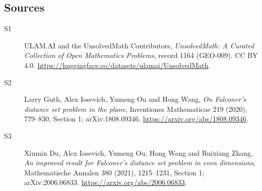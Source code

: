 \documentclass[11pt]{article}
\begin{document}
\subsection{Sources}
\begin{description}
\item[\hypertarget{source:1164:1}{S1}] ULAM.AI and the UnsolvedMath Contributors, \emph{UnsolvedMath: A Curated Collection of Open Mathematics Problems}, record 1164 (GEO-009). CC BY 4.0. \url{https://huggingface.co/datasets/ulamai/UnsolvedMath}.
\item[\hypertarget{source:1164:2}{S2}] Larry Guth, Alex Iosevich, Yumeng Ou and Hong Wang, \emph{On Falconer's distance set problem in the plane}, Inventiones Mathematicae 219 (2020), 779--830, Section 1; arXiv:1808.09346. \url{https://arxiv.org/abs/1808.09346}.
\item[\hypertarget{source:1164:3}{S3}] Xiumin Du, Alex Iosevich, Yumeng Ou, Hong Wang and Ruixiang Zhang, \emph{An improved result for Falconer's distance set problem in even dimensions}, Mathematische Annalen 380 (2021), 1215--1231, Section 1; arXiv:2006.06833. \url{https://arxiv.org/abs/2006.06833}.
\end{description}
\label{end:1164}
\end{document}
